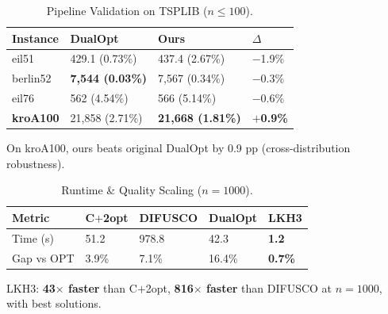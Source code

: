 \documentclass[10pt]{article}
\begin{document}
\begin{table}[h]
\centering
\caption{Pipeline Validation on TSPLIB ($n \le 100$).}
\label{tab:tsplib-pipe}
\small
\begin{tabular}{@{}llll@{}}
\toprule
\textbf{Instance} & \textbf{DualOpt} & \textbf{Ours} & \textbf{$\Delta$} \\
\midrule
eil51    & 429.1 (0.73\%) & 437.4 (2.67\%) & $-$1.9\% \\
berlin52 & \textbf{7,544 (0.03\%)} & 7,567 (0.34\%) & $-$0.3\% \\
eil76    & 562 (4.54\%) & 566 (5.14\%) & $-$0.6\% \\
\textbf{kroA100} & 21,858 (2.71\%) & \textbf{\textcolor{bestgreen}{21,668 (1.81\%)}} & \textbf{\textcolor{bestgreen}{$+$0.9\%}} \\
\bottomrule
\end{tabular}

\vspace{2pt}
{\footnotesize On kroA100, ours beats original DualOpt by 0.9 pp (cross-distribution robustness).}
\end{table}


\begin{table}[h]
\centering
\caption{Runtime \& Quality Scaling ($n = 1000$).}
\label{tab:runtime}
\small
\begin{tabular}{@{}lllll@{}}
\toprule
\textbf{Metric} & \textbf{C$+$2opt} & \textbf{DIFUSCO} & \textbf{DualOpt} & \textbf{LKH3} \\
\midrule
Time (s)      & 51.2  & 978.8 & 42.3  & \textbf{\textcolor{bestgreen}{1.2}} \\
Gap vs OPT    & 3.9\% & 7.1\% & 16.4\% & \textbf{\textcolor{bestgreen}{0.7\%}} \\
\bottomrule
\end{tabular}

\vspace{2pt}
{\footnotesize LKH3: \textbf{43$\times$ faster} than C$+$2opt, \textbf{816$\times$ faster} than DIFUSCO at $n=1000$, with best solutions.}
\end{table}
\end{document}
